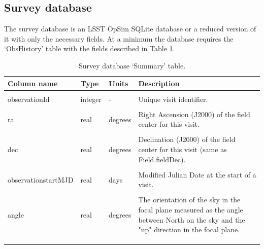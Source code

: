 \documentclass[10pt,a4paper]{article}
\begin{document}
\subsection{Survey database}

The survey database is an LSST OpSim SQLite database or a reduced
version of it with only the necessary fields. At a minimum the database
requires the `ObsHistory' table with the fields described in Table
\ref{tab:sumdesc}.

\begin{longtable}{l l p{20mm} p{50mm}}
    \hline
    Column name                   & Type     & Units   & Description\\
    \hline \hline \\
    observationId                 & integer  & -       & Unique visit identifier. \\ \\
    ra                            & real     & degrees & Right Ascension (J2000) of the field center for this visit. \\ \\
    dec                           & real     & degrees & Declination (J2000) of the field center for this visit (same as Field.fieldDec).\\ \\
    observationstartMJD           & real     & days    & Modified Julian Date at the start of a visit. \\ \\
    angle                         & real     & degrees & The orientation of the sky in the focal plane measured 
                                                         as the angle between North on the sky and the "up" direction 
                                                         in the focal plane. \\ \\
\hline \\


\caption{Survey database `Summary' table.}
\label{tab:sumdesc}                                                                   
\end{longtable}
\end{document}
